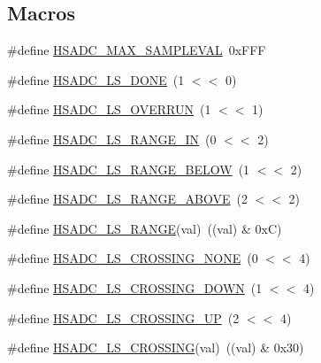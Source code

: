 \subsection*{Macros}
\begin{DoxyCompactItemize}
\item 
\#define \hyperlink{group___h_s_a_d_c__18_x_x__43_x_x_ga125fd0f116ea9e450347efe49ecc9673}{H\+S\+A\+D\+C\+\_\+\+M\+A\+X\+\_\+\+S\+A\+M\+P\+L\+E\+V\+AL}~0x\+F\+FF
\item 
\#define \hyperlink{group___h_s_a_d_c__18_x_x__43_x_x_ga3e9186020c5e406feed470a1808363f3}{H\+S\+A\+D\+C\+\_\+\+L\+S\+\_\+\+D\+O\+NE}~(1 $<$$<$ 0)
\item 
\#define \hyperlink{group___h_s_a_d_c__18_x_x__43_x_x_ga5c0a9c9126e736e08a7bb6330a8da5da}{H\+S\+A\+D\+C\+\_\+\+L\+S\+\_\+\+O\+V\+E\+R\+R\+UN}~(1 $<$$<$ 1)
\item 
\#define \hyperlink{group___h_s_a_d_c__18_x_x__43_x_x_gabf5cce50eca68e4c98b7d7d878e34ce8}{H\+S\+A\+D\+C\+\_\+\+L\+S\+\_\+\+R\+A\+N\+G\+E\+\_\+\+IN}~(0 $<$$<$ 2)
\item 
\#define \hyperlink{group___h_s_a_d_c__18_x_x__43_x_x_ga0d03219d2f21b7082c71e737f9291238}{H\+S\+A\+D\+C\+\_\+\+L\+S\+\_\+\+R\+A\+N\+G\+E\+\_\+\+B\+E\+L\+OW}~(1 $<$$<$ 2)
\item 
\#define \hyperlink{group___h_s_a_d_c__18_x_x__43_x_x_ga2ff163a7e694c903c3ea800b69ff357f}{H\+S\+A\+D\+C\+\_\+\+L\+S\+\_\+\+R\+A\+N\+G\+E\+\_\+\+A\+B\+O\+VE}~(2 $<$$<$ 2)
\item 
\#define \hyperlink{group___h_s_a_d_c__18_x_x__43_x_x_gab8577fad41f87c7822073b4b0e1b40c3}{H\+S\+A\+D\+C\+\_\+\+L\+S\+\_\+\+R\+A\+N\+GE}(val)~((val) \& 0x\+C)
\item 
\#define \hyperlink{group___h_s_a_d_c__18_x_x__43_x_x_ga232e739e7c2601b9c0e3cdaede3ff83e}{H\+S\+A\+D\+C\+\_\+\+L\+S\+\_\+\+C\+R\+O\+S\+S\+I\+N\+G\+\_\+\+N\+O\+NE}~(0 $<$$<$ 4)
\item 
\#define \hyperlink{group___h_s_a_d_c__18_x_x__43_x_x_ga5256afbf3a733f1e1598086bcae21313}{H\+S\+A\+D\+C\+\_\+\+L\+S\+\_\+\+C\+R\+O\+S\+S\+I\+N\+G\+\_\+\+D\+O\+WN}~(1 $<$$<$ 4)
\item 
\#define \hyperlink{group___h_s_a_d_c__18_x_x__43_x_x_ga61403d754e6e74e765939cbcdf668458}{H\+S\+A\+D\+C\+\_\+\+L\+S\+\_\+\+C\+R\+O\+S\+S\+I\+N\+G\+\_\+\+UP}~(2 $<$$<$ 4)
\item 
\#define \hyperlink{group___h_s_a_d_c__18_x_x__43_x_x_gabe3b261486872f47b15142374e8ba513}{H\+S\+A\+D\+C\+\_\+\+L\+S\+\_\+\+C\+R\+O\+S\+S\+I\+NG}(val)~((val) \& 0x30)
\item 

\end{DoxyCompactItemize}
